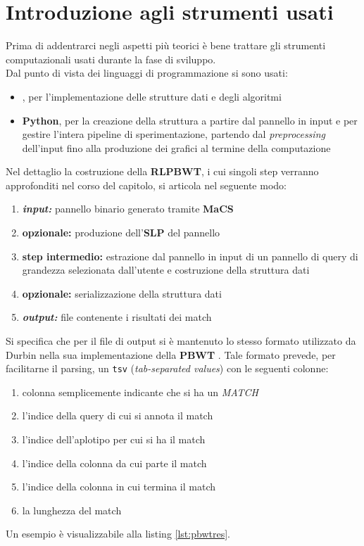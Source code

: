 \section{Introduzione agli strumenti usati}
Prima di addentrarci negli aspetti più teorici è bene trattare gli strumenti
computazionali usati durante la fase di sviluppo.\\
Dal punto di vista dei linguaggi di programmazione si sono usati:
\begin{itemize}
  \item \textbf{\Cplusplus}, per l'implementazione delle strutture dati e degli
  algoritmi
  \item \textbf{Python}, per la creazione della struttura a partire dal
  pannello in input e per gestire l'intera pipeline di sperimentazione,
  partendo dal \textit{preprocessing} dell'input fino alla produzione dei
  grafici al termine della computazione
\end{itemize}
Nel dettaglio la costruzione della \textbf{RLPBWT}, i cui
singoli step verranno approfonditi nel corso del capitolo, si articola nel
seguente modo: 
\begin{enumerate}
  \item \textit{\textbf{input:}} pannello binario generato tramite
  \textbf{MaCS}
  \item \textbf{opzionale:} produzione dell'\textbf{SLP} del pannello
  \item \textbf{step intermedio:} estrazione dal pannello in input di un
  pannello di query di grandezza selezionata dall'utente e costruzione della
  struttura dati  
  \item \textbf{opzionale:} serializzazione della struttura dati
  \item \textit{\textbf{output:}} file contenente i risultati dei match
\end{enumerate}
Si specifica che per il file di output si è mantenuto lo stesso formato
utilizzato da Durbin nella sua implementazione della \textbf{PBWT}
\cite{durbin_gh}. Tale formato prevede, per facilitarne il parsing, un
\texttt{tsv} (\textit{tab-separated values}) con le seguenti colonne:
\begin{enumerate}
  \item colonna semplicemente indicante che si ha un \textit{MATCH}
  \item l'indice della query di cui si annota il match
  \item l'indice dell'aplotipo per cui si ha il match
  \item l'indice della colonna da cui parte il match
  \item l'indice della colonna in cui termina il match
  \item la lunghezza del match
\end{enumerate}
Un esempio è visualizzabile alla listing \ref{lst:pbwtres}.
